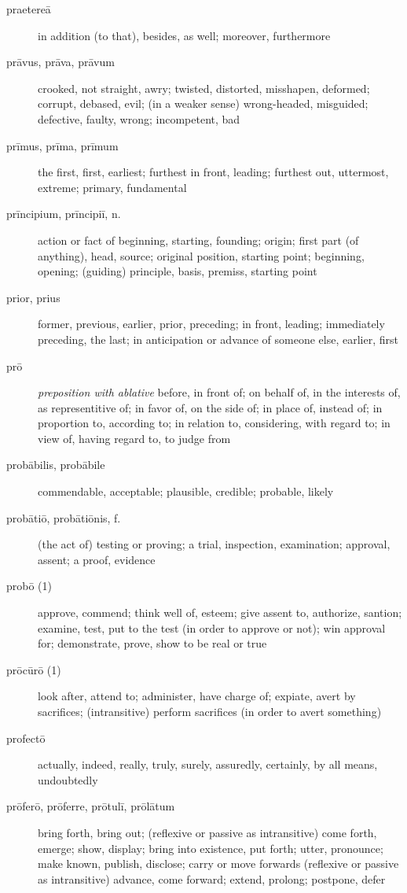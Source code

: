 \begin{description}
    \item[praetereā] \marginnote{*}in addition (to that), besides, as well; moreover, furthermore
    \item[prāvus, prāva, prāvum] crooked, not straight, awry; twisted, distorted, misshapen, deformed; corrupt, debased, evil; (in a weaker sense) wrong-headed, misguided; defective, faulty, wrong; incompetent, bad
    \item[prīmus, prīma, prīmum] \marginnote{*}the first, first, earliest; furthest in front, leading; furthest out, uttermost, extreme; primary, fundamental
    \item[prīncipium, prīncipiī, n.] \marginnote{*}action or fact of beginning, starting, founding; origin; first part (of anything), head, source; original position, starting point; beginning, opening; (guiding) principle, basis, premiss, starting point
    \item[prior, prius] \marginnote{*}former, previous, earlier, prior, preceding; in front, leading; immediately preceding, the last; in anticipation or advance of someone else, earlier, first
    \item[prō] \marginnote{*}\textit{preposition with ablative} before, in front of; on behalf of, in the interests of, as representitive of; in favor of, on the side of; in place of, instead of; in proportion to, according to; in relation to, considering, with regard to; in view of, having regard to, to judge from
    \item[probābilis, probābile] commendable, acceptable; plausible, credible; probable, likely
    \item[probātiō, probātiōnis, f.] (the act of) testing or proving; a trial, inspection, examination; approval, assent; a proof, evidence
    \item[probō (1)] \marginnote{*}approve, commend; think well of, esteem; give assent to, authorize, santion; examine, test, put to the test (in order to approve or not); win approval for; demonstrate, prove, show to be real or true
    \item[prōcūrō (1)] look after, attend to; administer, have charge of; expiate, avert by sacrifices; (intransitive) perform sacrifices (in order to avert something)
    \item[profectō] actually, indeed, really, truly, surely, assuredly, certainly, by all means, undoubtedly
    \item[prōferō, prōferre, prōtulī, prōlātum] bring forth, bring out; (reflexive or passive as intransitive) come forth, emerge; show, display; bring into existence, put forth; utter, pronounce; make known, publish, disclose; carry or move forwards (reflexive or passive as intransitive) advance, come forward; extend, prolong; postpone, defer

\end{description}
